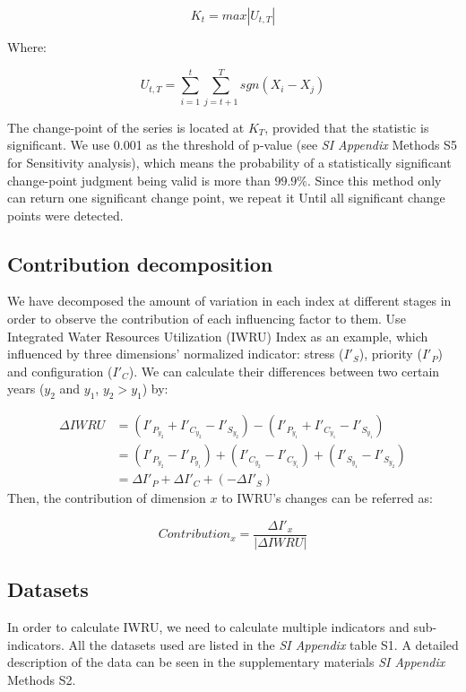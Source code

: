 \documentclass[9pt, twocolumn, twoside, lineno]{pnas-new}
\begin{document}
{		$$ K_t = max|U_{t, T}|$$

		Where:

		$$ U_{t, T} = \sum_{i=1}^t\sum_{j=t+1}^T sgn(X_i - X_j) $$
	
		The change-point of the series is located at $K_T$, provided that the statistic is significant. We use 0.001 as the threshold  of p-value (see \textit{SI Appendix} Methods S5 for Sensitivity analysis), which means the probability of a statistically significant change-point judgment being valid is more than $99.9\%$.
		Since this method only can return one significant change point, we repeat it Until all significant change points were detected.
	
	\subsection*{Contribution decomposition}
		We have decomposed the amount of variation in each index at different stages in order to observe the contribution of each influencing factor to them. Use Integrated Water Resources Utilization (IWRU) Index as an example, which influenced by three dimensions' normalized indicator: stress ($I'_S$), priority ($I'_P$) and configuration ($I'_C$). We can calculate their differences between two certain years ($y_2$ and $y_1$, $y_2 > y_1$) by:

		\begin{align*}
			\Delta IWRU &= (I'_{P_{y_2}} + I'_{C_{y_2}} - I'_{S_{y_2}}) - (I'_{P_{y_1}} + I'_{C_{y_1}} - I'_{S_{y_1}}) \\
			&= (I'_{P_{y_2}} - I'_{P_{y_1}}) + (I'_{C_{y_2}} - I'_{C_{y_1}}) + (I'_{S_{y_1}} - I'_{S_{y_2}}) \\
			&= \Delta I'_P + \Delta I'_C + (-\Delta I'_S)
		\end{align*}
		Then, the contribution of dimension $x$ to IWRU's changes can be referred as:

		$$ Contribution_x = \frac{\Delta I'_x}{|\Delta IWRU|} $$



	\subsection*{Datasets}
	In order to calculate IWRU, we need to calculate multiple indicators and sub-indicators. All the datasets used are listed in the \textit{SI Appendix} table S1. A detailed description of the data can be seen in the supplementary materials \textit{SI Appendix} Methods S2.
}
\end{document}
